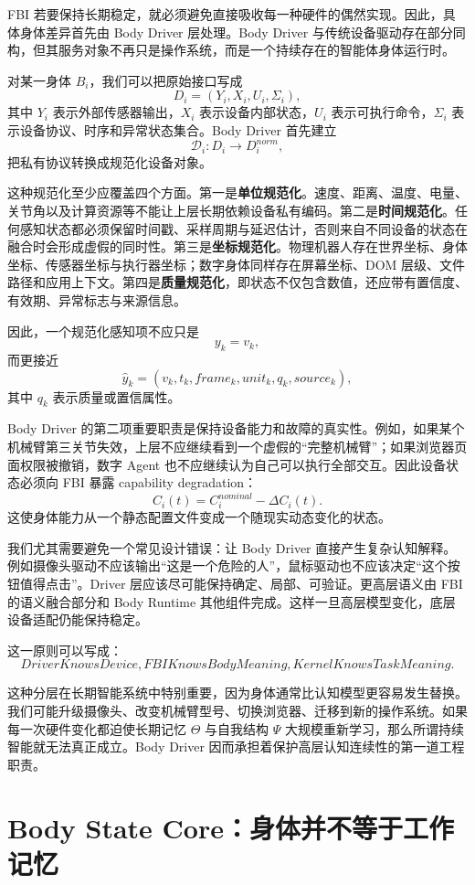 FBI 若要保持长期稳定，就必须避免直接吸收每一种硬件的偶然实现。因此，具体身体差异首先由 Body Driver 层处理。Body Driver 与传统设备驱动存在部分同构，但其服务对象不再只是操作系统，而是一个持续存在的智能体身体运行时。

对某一身体 \(B_i\)，我们可以把原始接口写成
\[
D_i
=
(
Y_i,
X_i,
U_i,
\Sigma_i
),
\]
其中 \(Y_i\) 表示外部传感器输出，\(X_i\) 表示设备内部状态，\(U_i\) 表示可执行命令，\(\Sigma_i\) 表示设备协议、时序和异常状态集合。Body Driver 首先建立
\[
\mathcal D_i:
D_i
\rightarrow
D_i^{norm},
\]
把私有协议转换成规范化设备对象。

这种规范化至少应覆盖四个方面。第一是\textbf{单位规范化}。速度、距离、温度、电量、关节角以及计算资源等不能让上层长期依赖设备私有编码。第二是\textbf{时间规范化}。任何感知状态都必须保留时间戳、采样周期与延迟估计，否则来自不同设备的状态在融合时会形成虚假的同时性。第三是\textbf{坐标规范化}。物理机器人存在世界坐标、身体坐标、传感器坐标与执行器坐标；数字身体同样存在屏幕坐标、DOM 层级、文件路径和应用上下文。第四是\textbf{质量规范化}，即状态不仅包含数值，还应带有置信度、有效期、异常标志与来源信息。

因此，一个规范化感知项不应只是
\[
y_k=v_k,
\]
而更接近
\[
\hat y_k
=
(
v_k,
t_k,
frame_k,
unit_k,
q_k,
source_k
),
\]
其中 \(q_k\) 表示质量或置信属性。

Body Driver 的第二项重要职责是保持设备能力和故障的真实性。例如，如果某个机械臂第三关节失效，上层不应继续看到一个虚假的“完整机械臂”；如果浏览器页面权限被撤销，数字 Agent 也不应继续认为自己可以执行全部交互。因此设备状态必须向 FBI 暴露 capability degradation：
\[
C_i(t)
=
C_i^{nominal}
-
\Delta C_i(t).
\]
这使身体能力从一个静态配置文件变成一个随现实动态变化的状态。

我们尤其需要避免一个常见设计错误：让 Body Driver 直接产生复杂认知解释。例如摄像头驱动不应该输出“这是一个危险的人”，鼠标驱动也不应该决定“这个按钮值得点击”。Driver 层应该尽可能保持确定、局部、可验证。更高层语义由 FBI 的语义融合部分和 Body Runtime 其他组件完成。这样一旦高层模型变化，底层设备适配仍能保持稳定。

这一原则可以写成：
\[
\boxed{
DriverKnowsDevice,
FBIKnowsBodyMeaning,
KernelKnowsTaskMeaning.
}
\]

这种分层在长期智能系统中特别重要，因为身体通常比认知模型更容易发生替换。我们可能升级摄像头、改变机械臂型号、切换浏览器、迁移到新的操作系统。如果每一次硬件变化都迫使长期记忆 \(\Theta\) 与自我结构 \(\Psi\) 大规模重新学习，那么所谓持续智能就无法真正成立。Body Driver 因而承担着保护高层认知连续性的第一道工程职责。


\section{Body State Core：身体并不等于工作记忆}

